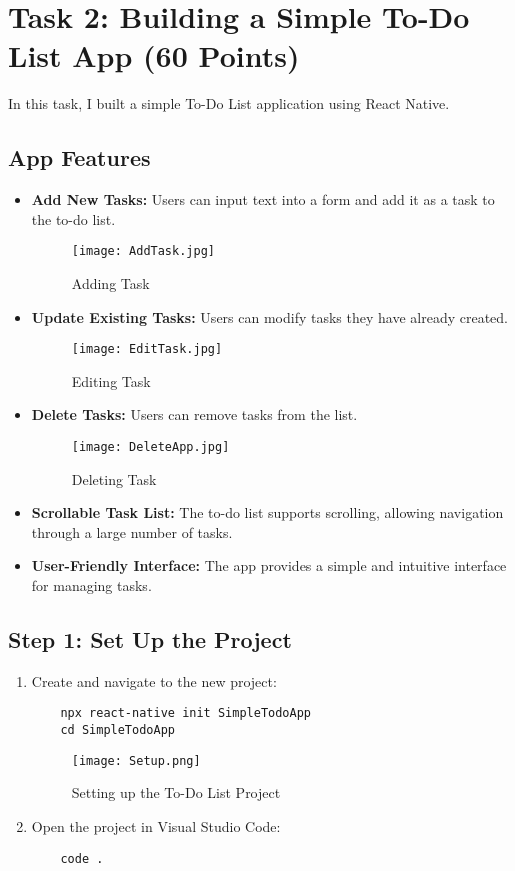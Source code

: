\documentclass{article}
\begin{document}
\section{Task 2: Building a Simple To-Do List App (60 Points)}
In this task, I built a simple To-Do List application using React Native.

\subsection{App Features}
\begin{itemize}
    \item \textbf{Add New Tasks:} Users can input text into a form and add it as a task to the to-do list.
    \begin{figure}[H]
        \centering
        \texttt{[image: AddTask.jpg]}
        \caption{Adding Task}
    \end{figure}

    \item \textbf{Update Existing Tasks:} Users can modify tasks they have already created.
    \begin{figure}[H]
        \centering
        \texttt{[image: EditTask.jpg]}
        \caption{Editing Task}
    \end{figure}
    
    
    \item \textbf{Delete Tasks:} Users can remove tasks from the list.
    \begin{figure}[H]
        \centering
        \texttt{[image: DeleteApp.jpg]}
        \caption{Deleting Task}
    \end{figure}
  
    
    \item \textbf{Scrollable Task List:} The to-do list supports scrolling, allowing navigation through a large number of tasks.

    \item \textbf{User-Friendly Interface:} The app provides a simple and intuitive interface for managing tasks.
\end{itemize}

\subsection{Step 1: Set Up the Project}
\begin{enumerate}
    \item Create and navigate to the new project:
    \begin{verbatim}
    npx react-native init SimpleTodoApp
    cd SimpleTodoApp
    \end{verbatim}
    \begin{figure}[H]
        \centering
        \texttt{[image: Setup.png]}
        \caption{Setting up the To-Do List Project}
    \end{figure}
    
    \item Open the project in Visual Studio Code:
    \begin{verbatim}
    code .
    \end{verbatim}
\end{enumerate}
\end{document}
